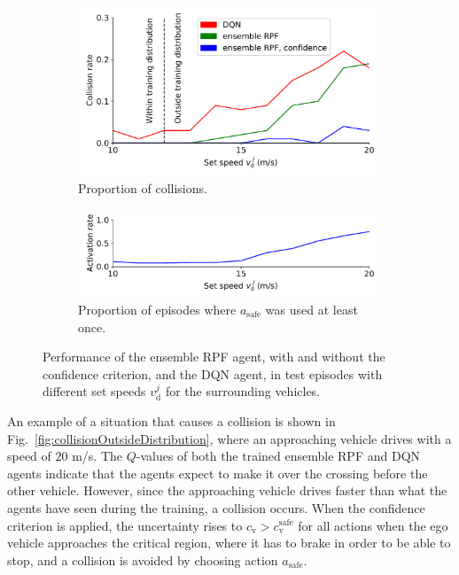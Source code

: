 \begin{figure}[!t]
	\centering
	\begin{subfigure}[]{0.99\columnwidth}
	\centering
		\includegraphics[width=0.99\columnwidth]{figures/collisions_outside_distribution_2_wo_type_3_fonts.pdf}
		\caption{Proportion of collisions.}
	\end{subfigure}
	
	\vspace{5pt}
	
	\begin{subfigure}[]{0.99\columnwidth}
	\centering
		\includegraphics[width=0.99\columnwidth]{figures/activation_rate_2_wo_type_3_fonts.pdf}
		\caption{Proportion of episodes where $a_\mathrm{safe}$ was used at least once.}
	\end{subfigure}
	\caption{Performance of the ensemble RPF agent, with and without the confidence criterion, and the DQN agent, in test episodes with different set speeds $v_\mathrm{d}^j$ for the surrounding vehicles. %
	}
	\label{fig:performanceOutsideDistribution}
\end{figure}

An example of a situation that causes a collision is shown in Fig.~\ref{fig:collisionOutsideDistribution}, where an approaching vehicle drives with a speed of $20$ m/s. The $Q$-values of both the trained ensemble RPF and DQN agents indicate that the agents expect to make it over the crossing before the other vehicle. However, since the approaching vehicle drives faster than what the agents have seen during the training, a collision occurs. When the confidence criterion is applied, the uncertainty rises to $c_\mathrm{v}>c_\mathrm{v}^\mathrm{safe}$ for all actions when the ego vehicle approaches the critical region, where it has to brake in order to be able to stop, and a collision is avoided by choosing action $a_\mathrm{safe}$.


